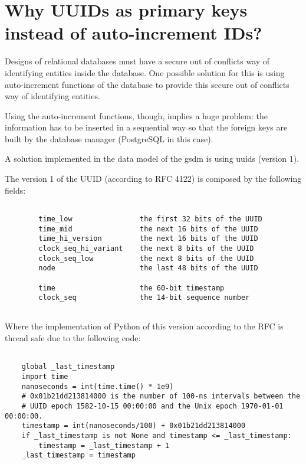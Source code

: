 \chapter{Why UUIDs as primary keys instead of auto-increment IDs?}

Designs of relational databases must have a secure out of conflicts way of identifying entities inside the database. One possible solution for this is using auto-increment functions of the database to provide this secure out of conflicts way of identifying entities.

Using the auto-increment functions, though, implies a huge problem: the information has to be inserted in a sequential way so that the foreign keys are built by the database manager (PostgreSQL in this case).

A solution implemented in the data model of the \acrshort{gsdm} is using \acrshort{uuid}s (version 1).

The version 1 of the UUID (according to RFC 4122) is composed by the following fields: 

\begin{lstlisting}[style=bash, caption={XML input example for showing the values structure management.}]

        time_low                the first 32 bits of the UUID
        time_mid                the next 16 bits of the UUID
        time_hi_version         the next 16 bits of the UUID
        clock_seq_hi_variant    the next 8 bits of the UUID
        clock_seq_low           the next 8 bits of the UUID
        node                    the last 48 bits of the UUID

        time                    the 60-bit timestamp
        clock_seq               the 14-bit sequence number
        
\end{lstlisting}

Where the implementation of Python of this version according to the RFC is thread safe due to the following code:

\begin{lstlisting}[style=python, caption={Python code showing how the algorithm provides a mechanism for using UUIDs in a thread safe manner.}]

    global _last_timestamp
    import time
    nanoseconds = int(time.time() * 1e9)
    # 0x01b21dd213814000 is the number of 100-ns intervals between the
    # UUID epoch 1582-10-15 00:00:00 and the Unix epoch 1970-01-01 00:00:00.
    timestamp = int(nanoseconds/100) + 0x01b21dd213814000
    if _last_timestamp is not None and timestamp <= _last_timestamp:
        timestamp = _last_timestamp + 1
    _last_timestamp = timestamp
    
\end{lstlisting}

